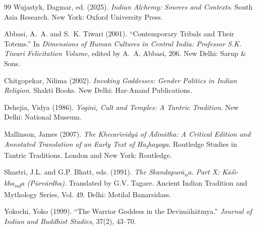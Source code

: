 \documentclass[11pt,twoside,letterpaper]{article}
\begin{document}
\begin{thebibliography}{99}
Wujastyk, Dagmar, ed. (2025). \textit{Indian Alchemy: Sources and Contexts}. South Asia Research. New York: Oxford University Press.

Abbasi, A.~A. and S.~K. Tiwari (2001). ``Contemporary Tribals and Their Totems.'' In \textit{Dimensions of Human Cultures in Central India: Professor S.K. Tiwari Felicitation Volume}, edited by A.~A. Abbasi, 206. New Delhi: Sarup \& Sons.

Chitgopekar, Nilima (2002). \textit{Invoking Goddesses: Gender Politics in Indian Religion}. Shakti Books. New Delhi: Har-Anand Publications.

Dehejia, Vidya (1986). \textit{Yogin\={\i}, Cult and Temples: A Tantric Tradition}. New Delhi: National Museum.

Mallinson, James (2007). \textit{The Khecar\={\i}vidy\={a} of \={A}d\={\i}n\={a}tha: A Critical Edition and Annotated Translation of an Early Text of Ha\textsubscript{t}hayoga}. Routledge Studies in Tantric Traditions. London and New York: Routledge.

Shastri, J.L. and G.P. Bhatt, eds. (1991). \textit{The Skandapur\={a}\textsubscript{n}a. Part X: K\={a}\'{s}\={\i}-kha\textsubscript{n}\textsubscript{d}a (P\={u}rv\={a}rdha)}. Translated by G.V. Tagare. Ancient Indian Tradition and Mythology Series, Vol. 49. Delhi: Motilal Banarsidass.

Yokochi, Yoko (1999). ``The Warrior Goddess in the Dev\={\i}m\={a}h\={a}tmya.'' \textit{Journal of Indian and Buddhist Studies}, 37(2), 43--70.

\end{thebibliography}

	
\end{document}
